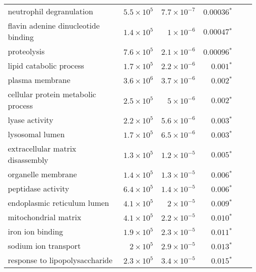 \begin{longtable*}{|l|r|r|r|r|r|}
    neutrophil degranulation                 & $5.5\times 10^{5}$ & $7.7\times 10^{-7}$  & $\bm{0.00036{^*}}$              \\
    flavin adenine dinucleotide binding      & $1.4\times 10^{5}$ & $ 1\times 10^{-6}$   & $\bm{0.00047{^*}}$              \\
    proteolysis                              & $7.6\times 10^{5}$ & $2.1\times 10^{-6}$  & $\bm{0.00096{^*}}$              \\
    lipid catabolic process                  & $1.7\times 10^{5}$ & $2.2\times 10^{-6}$  & $\bm{ 0.001{^*}}$               \\
    plasma membrane                          & $3.6\times 10^{6}$ & $3.7\times 10^{-6}$  & $\bm{ 0.002{^*}}$               \\
    cellular protein metabolic process       & $2.5\times 10^{5}$ & $ 5\times 10^{-6}$   & $\bm{ 0.002{^*}}$               \\
    lyase activity                           & $2.2\times 10^{5}$ & $5.6\times 10^{-6}$  & $\bm{ 0.003{^*}}$               \\
    lysosomal lumen                          & $1.7\times 10^{5}$ & $6.5\times 10^{-6}$  & $\bm{ 0.003{^*}}$               \\
    extracellular matrix disassembly         & $1.3\times 10^{5}$ & $1.2\times 10^{-5}$  & $\bm{ 0.005{^*}}$               \\
    organelle membrane                       & $1.4\times 10^{5}$ & $1.3\times 10^{-5}$  & $\bm{ 0.006{^*}}$               \\
    peptidase activity                       & $6.4\times 10^{5}$ & $1.4\times 10^{-5}$  & $\bm{ 0.006{^*}}$               \\
    endoplasmic reticulum lumen              & $4.1\times 10^{5}$ & $ 2\times 10^{-5}$   & $\bm{ 0.009{^*}}$               \\
    mitochondrial matrix                     & $4.1\times 10^{5}$ & $2.2\times 10^{-5}$  & $\bm{ 0.010{^*}}$               \\
    iron ion binding                         & $1.9\times 10^{5}$ & $2.3\times 10^{-5}$  & $\bm{ 0.011{^*}}$               \\
    sodium ion transport                     & $ 2\times 10^{5}$  & $2.9\times 10^{-5}$  & $\bm{ 0.013{^*}}$               \\
    response to lipopolysaccharide           & $2.3\times 10^{5}$ & $3.4\times 10^{-5}$  & $\bm{ 0.015{^*}}$               \\

\end{longtable*}
